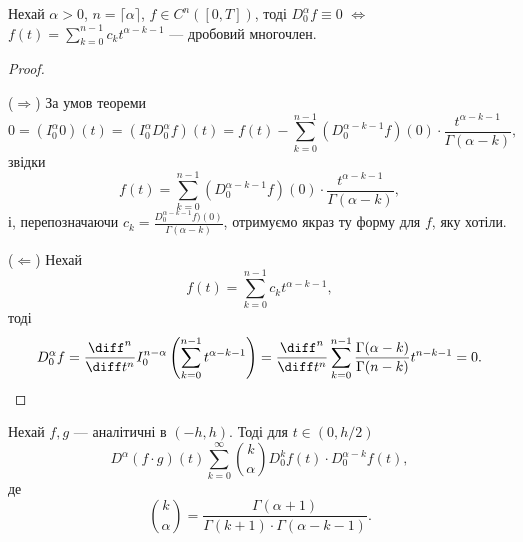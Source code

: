 \begin{theorem}
    Нехай $\alpha > 0$, $n = \lceil \alpha \rceil$, $f \in C^n([0, T])$, тоді $D_0^\alpha f \equiv 0$ $\iff$ $f(t) = \sum_{k = 0}^{n - 1} c_k t^{\alpha - k - 1}$ --- дробовий многочлен.
\end{theorem}
\begin{proof}
    $\left.\right.$
    \begin{exercise}
        ($\Longrightarrow$) За умов теореми 
        \begin{equation}
            0 = (I_0^\alpha 0)(t) = (I_0^\alpha D_0^\alpha f)(t) = f(t) - \sum_{k = 0}^{n - 1} (D_0^{\alpha - k  - 1} f)(0) \cdot \frac{t^{\alpha - k - 1}}{\Gamma(\alpha - k)},
        \end{equation}
        звідки
        \begin{equation}
            f(t) = \sum_{k = 0}^{n - 1} (D_0^{\alpha - k - 1} f)(0) \cdot \frac{t^{\alpha - k - 1}}{\Gamma(\alpha - k)},
        \end{equation}
        і, перепозначаючи $c_k = \frac{D_0^{\alpha - k - 1} f)(0)}{\Gamma(\alpha - k)}$, отримуємо якраз ту форму для $f$, яку хотіли.
    \end{exercise}
    
    ($\Longleftarrow$) Нехай
    \begin{equation}
        f(t) = \sum_{k = 0}^{n - 1} c_k t^{\alpha - k - 1},
    \end{equation}
    тоді 
    \begin{equation}
        D_0^\alpha f = \frac{\diff^n}{\diff t^n} I_0^{n - \alpha} \left( \sum_{k = 0}^{n - 1} t^{\alpha - k - 1} \right) = \frac{\diff^n}{\diff t^n} \sum_{k = 0}^{n - 1} \frac{\Gamma(\alpha - k)}{\Gamma(n - k)} t^{n - k - 1} = 0.
    \end{equation}
\end{proof}

\begin{theorem}
    Нехай $f, g$ --- аналітичні в $(-h, h)$. Тоді для $t \in (0, h/2)$
    \begin{equation}
        D^\alpha (f \cdot g) (t) \sum_{k = 0}^\infty \binom{k}{\alpha} D_0^k f(t) \cdot D_0^{\alpha - k} f(t),
    \end{equation}
    де
    \begin{equation}
        \binom{k}{\alpha} = \frac{\Gamma(\alpha + 1)}{\Gamma(k + 1) \cdot \Gamma(\alpha - k - 1)}.
    \end{equation}
\end{theorem}

